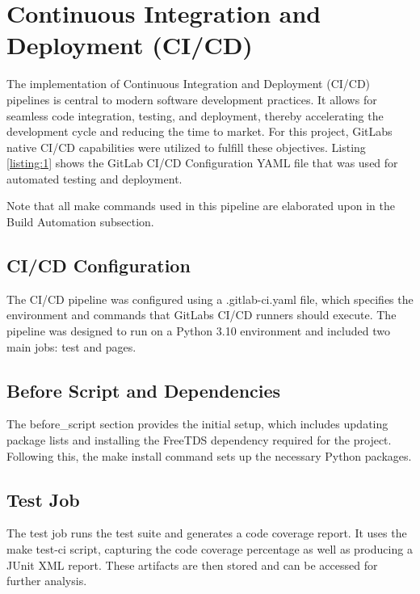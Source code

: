 \section{Continuous Integration and Deployment
(CI/CD)}\label{continuous-integration-and-deployment-cicd}

The implementation of Continuous Integration and Deployment (CI/CD)
pipelines is central to modern software development practices. It allows
for seamless code integration, testing, and deployment, thereby
accelerating the development cycle and reducing the time to market. For
this project, GitLab\textquotesingle s native CI/CD capabilities were
utilized to fulfill these objectives. Listing \ref{listing:1} shows the GitLab CI/CD
Configuration YAML file that was used for automated testing and
deployment.

Note that all make commands used in this pipeline are elaborated upon in
the Build Automation subsection.

\subsection{CI/CD Configuration}\label{cicd-configuration}

The CI/CD pipeline was configured using a .gitlab-ci.yaml file, which
specifies the environment and commands that GitLab\textquotesingle s
CI/CD runners should execute. The pipeline was designed to run on a
Python 3.10 environment and included two main jobs: test and pages.

\subsection{Before Script and
Dependencies}\label{before-script-and-dependencies}

The before\_script section provides the initial setup, which includes
updating package lists and installing the FreeTDS dependency required
for the project. Following this, the make install command sets up the
necessary Python packages.

\subsection{Test Job}\label{test-job}

The test job runs the test suite and generates a code coverage report.
It uses the make test-ci script, capturing the code coverage percentage
as well as producing a JUnit XML report. These artifacts are then stored
and can be accessed for further analysis.

